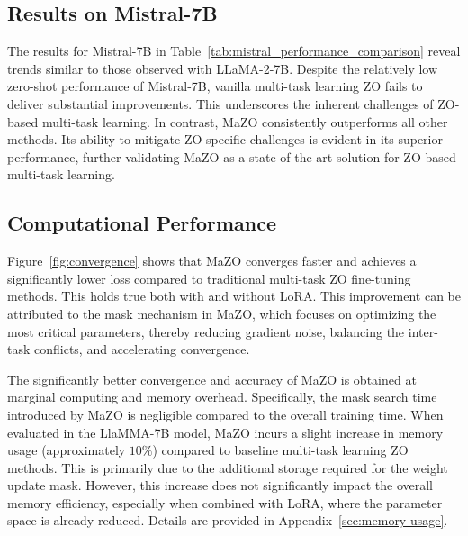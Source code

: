 \subsection{Results on Mistral-7B}  
The results for Mistral-7B in Table~\ref{tab:mistral_performance_comparison} reveal trends similar to those observed with LLaMA-2-7B. Despite the relatively low zero-shot performance of Mistral-7B, vanilla multi-task learning ZO fails to deliver substantial improvements. This underscores the inherent challenges of ZO-based multi-task learning.
In contrast, MaZO consistently outperforms all other methods. Its ability to mitigate ZO-specific challenges is evident in its superior performance, further validating MaZO as a state-of-the-art solution for ZO-based multi-task learning.


\subsection{Computational Performance}
  
Figure~\ref{fig:convergence} shows that MaZO converges faster and achieves a significantly lower loss compared to traditional multi-task ZO fine-tuning methods. This holds true both with and without LoRA. This improvement can be attributed to the mask mechanism in MaZO, which focuses on optimizing the most critical parameters, thereby reducing gradient noise, balancing the inter-task conflicts, and accelerating convergence.

The significantly better convergence and accuracy of MaZO is obtained at marginal computing and memory overhead. Specifically, the mask search time introduced by MaZO is negligible compared to the overall training time. When evaluated in the LlaMMA-7B model, MaZO incurs a slight increase in memory usage (approximately $10\%$) compared to baseline multi-task learning ZO methods. This is primarily due to the additional storage required for the weight update mask. However, this increase does not significantly impact the overall memory efficiency, especially when combined with LoRA, where the parameter space is already reduced. Details are provided in Appendix~\ref{sec:memory usage}.


